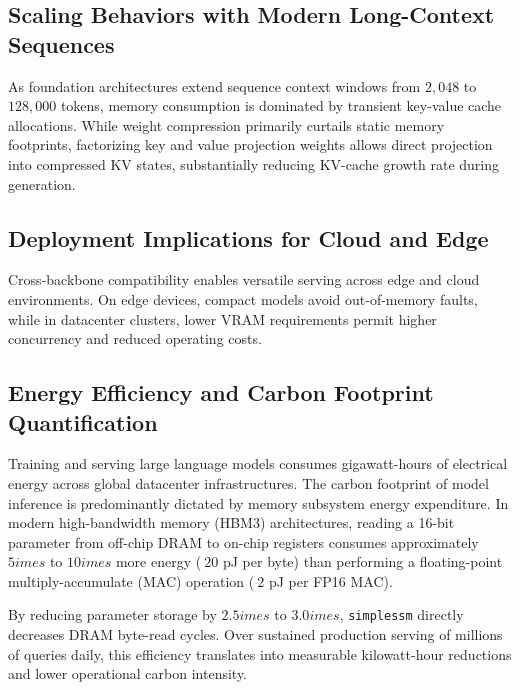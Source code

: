 \subsection{Scaling Behaviors with Modern Long-Context Sequences}
As foundation architectures extend sequence context windows from $2{,}048$ to $128{,}000$ tokens, memory consumption is dominated by transient key-value cache allocations. While weight compression primarily curtails static memory footprints, factorizing key and value projection weights allows direct projection into compressed KV states, substantially reducing KV-cache growth rate during generation.

\subsection{Deployment Implications for Cloud and Edge}
Cross-backbone compatibility enables versatile serving across edge and cloud environments. On edge devices, compact models avoid out-of-memory faults, while in datacenter clusters, lower VRAM requirements permit higher concurrency and reduced operating costs.

\subsection{Energy Efficiency and Carbon Footprint Quantification}
Training and serving large language models consumes gigawatt-hours of electrical energy across global datacenter infrastructures. The carbon footprint of model inference is predominantly dictated by memory subsystem energy expenditure. In modern high-bandwidth memory (HBM3) architectures, reading a 16-bit parameter from off-chip DRAM to on-chip registers consumes approximately $5	imes$ to $10	imes$ more energy ($~20$ pJ per byte) than performing a floating-point multiply-accumulate (MAC) operation ($~2$ pJ per FP16 MAC).

By reducing parameter storage by $2.5	imes$ to $3.0	imes$, \texttt{simplessm} directly decreases DRAM byte-read cycles. Over sustained production serving of millions of queries daily, this efficiency translates into measurable kilowatt-hour reductions and lower operational carbon intensity.
